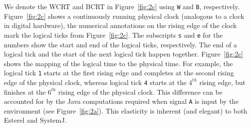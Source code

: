 We denote the WCRT and BCRT in Figure~\ref{fig:2c} using \texttt{W} and
\texttt{B}, respectively. Figure~\ref{fig:2c} shows a continuously
running physical clock (analogous to a clock in digital hardware), the
numerical annotations on the rising edge of the clock mark the logical
ticks from Figure~\ref{fig:2c}. The subscripts \texttt{s} and \texttt{e}
for the numbers show the start and end of the logical ticks,
respectively. The end of a logical tick and the start of the next
logical tick happen together. Figure~\ref{fig:2c} shows the mapping of
the logical time to the physical time. For example, the logical tick
\texttt{1} starts at the first rising edge and completes at the second
rising edge of the physical clock, whereas logical tick \texttt{4}
starts at the $4^{th}$ rising edge, but finishes at the $6^{th}$ rising
edge of the physical clock. This difference can be accounted for by the
Java computations required when signal \texttt{A} is input by the
environment (see Figure~\ref{fig:2a}). This elasticity is inherent (and
elegant) to both Esterel and SystemJ.






